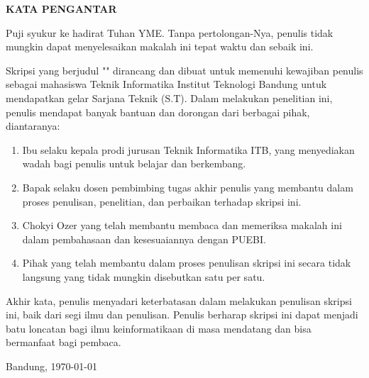 \clearpage

\begin{center}
 \textbf{\large KATA PENGANTAR}\\[3em]
\end{center}

Puji syukur ke hadirat Tuhan YME. Tanpa pertolongan-Nya, penulis tidak mungkin dapat menyelesaikan makalah ini tepat waktu dan sebaik ini.

Skripsi yang berjudul "\textit{\thetitle}" dirancang dan dibuat untuk memenuhi kewajiban penulis sebagai mahasiswa Teknik Informatika Institut Teknologi Bandung untuk mendapatkan gelar Sarjana Teknik (S.T).
Dalam melakukan penelitian ini, penulis mendapat banyak bantuan dan dorongan dari berbagai pihak, diantaranya:
\begin{enumerate}
  \item Ibu \dean{} selaku kepala prodi jurusan Teknik Informatika ITB, yang menyediakan wadah bagi penulis untuk belajar dan berkembang.
  \item Bapak \supervisor{} selaku dosen pembimbing tugas akhir penulis yang membantu dalam proses penulisan, penelitian, dan perbaikan terhadap skripsi ini.
  \item Chokyi Ozer yang telah membantu membaca dan memeriksa makalah ini dalam pembahasaan dan kesesuaiannya dengan PUEBI. 
  \item Pihak yang telah membantu dalam proses penulisan skripsi ini secara tidak langsung yang tidak mungkin disebutkan satu per satu. 
\end{enumerate}

Akhir kata, penulis menyadari keterbatasan dalam melakukan penulisan skripsi ini, baik dari segi ilmu dan penulisan.
Penulis berharap skripsi ini dapat menjadi batu loncatan bagi ilmu keinformatikaan di masa mendatang dan bisa bermanfaat bagi pembaca.

Bandung, \today

\theauthor


